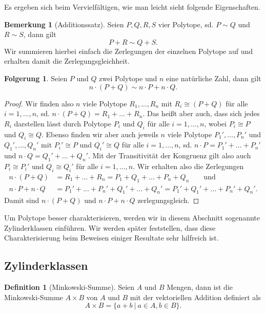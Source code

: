 \documentclass[11pt,titlepage]{article}
\theoremstyle{definition}
\newtheorem{corollary}[theorem]{Folgerung}
\newtheorem{definition}[theorem]{Definition}
\newtheorem{remark}[theorem]{Bemerkung}
\theoremstyle{remark}
\begin{document}
	Es ergeben sich beim Vervielfältigen, wie man leicht sieht folgende Eigenschaften.
	
	\begin{remark}[Additionssatz] \label{bem:addsatz}
		Seien $P,Q,R,S$ vier Polytope, sd. $P\sim Q$ und $R\sim S$, dann gilt
		\[P+R\sim Q+S.\]
		Wir summieren hierbei einfach die Zerlegungen der einzelnen Polytope 
		auf und erhalten damit die Zerlegungsgleichheit.
	\end{remark}
	
	\begin{corollary} \label{coroll:vervielfältigung}
		Seien $P$ und $Q$ zwei Polytope und $n$ eine natürliche Zahl, dann gilt
		\[n\cdot(P+Q)\sim n\cdot P+n\cdot Q.\]
	\end{corollary}
	
	\begin{proof}
		Wir finden also $n$ viele Polytope $R_1,\ldots,R_n$ mit 
		$R_i\cong (P+Q)$ für alle $i=1,\ldots,n$, sd. 
		$n\cdot(P+Q)=R_1+\ldots+R_n$. Das heißt aber auch, dass sich jedes 
		$R_i$ darstellen lässt durch Polytope $P_i$ und $Q_i$ für alle 
		$i=1,\ldots,n$, wobei $P_i\cong P$ und $Q_i\cong Q$. Ebenso finden wir 
		aber auch jeweils $n$ viele Polytope 
		$P_1',\ldots,P_n'$ und $Q_1',\ldots,Q_n'$ mit $P_i'\cong P$ und 
		$Q_i'\cong Q$ für alle $i=1,\ldots,n$, sd. $n\cdot P=P_1'+\ldots+P_n'$ und 
		$n\cdot Q=Q_1'+\ldots+Q_n'$. Mit der Transitivität der Kongruenz 
		gilt also auch $P_i\cong P_i'$ und $Q_i\cong Q_i'$ für alle 
		$i=1,\ldots,n$. Wir erhalten also die Zerlegungen
		\begin{align*}
		n\cdot(P+Q)&=R_1+\ldots+R_n=P_1+Q_1+\ldots+P_n+Q_n \qquad\text{und}\\
		n\cdot P+n\cdot Q&=P_1'+\ldots+P_n'+Q_1'+\ldots+Q_n'=
		P_1'+Q_1'+\ldots+P_n'+Q_n'.
		\end{align*}
		Damit sind $n\cdot (P+Q)$ und $n\cdot P+n\cdot Q$ zerlegungsgleich.
	\end{proof}

	Um Polytope besser charakterisieren, werden wir in diesem Abschnitt 
	sogenannte Zylinderklassen einführen. Wir werden später feststellen, 
	dass diese Charakterisierung beim Beweisen einiger Resultate sehr 
	hilfreich ist.

	\subsection{Zylinderklassen}
	
	\begin{definition}[Minkowski-Summe]
		Seien $A$ und $B$ Mengen, dann ist die Minkowski-Summe $A\times B$ 
		von $A$ und $B$ mit der vektoriellen Addition definiert als
		\[A\times B=\left.\{a+b\ \right\vert\ a\in A,b\in B\}.\]
	\end{definition}
	
\end{document}
